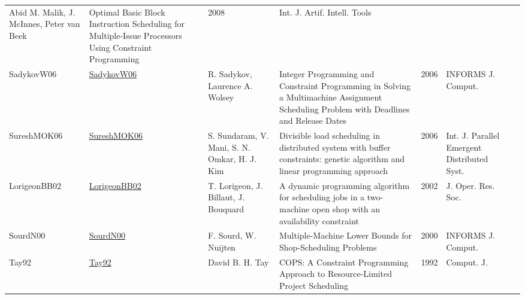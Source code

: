 {\begin{longtable}{llp{5cm}p{10cm}rp{3cm}l}
Abid M. Malik, J. McInnes, Peter van Beek & Optimal Basic Block Instruction Scheduling for Multiple-Issue Processors Using Constraint Programming & 2008 & Int. J. Artif. Intell. Tools & \cite{MalikMB08}\\SadykovW06 & \href{https://doi.org/10.1287/ijoc.1040.0110}{SadykovW06} & R. Sadykov, Laurence A. Wolsey & Integer Programming and Constraint Programming in Solving a Multimachine Assignment Scheduling Problem with Deadlines and Release Dates & 2006 & {INFORMS} J. Comput. & \cite{SadykovW06}\\SureshMOK06 & \href{https://doi.org/10.1080/17445760600567842}{SureshMOK06} & S. Sundaram, V. Mani, S. N. Omkar, H. J. Kim & Divisible load scheduling in distributed system with buffer constraints: genetic algorithm and linear programming approach & 2006 & Int. J. Parallel Emergent Distributed Syst. & \cite{SureshMOK06}\\LorigeonBB02 & \href{https://doi.org/10.1057/palgrave.jors.2601421}{LorigeonBB02} & T. Lorigeon, J. Billaut, J. Bouquard & A dynamic programming algorithm for scheduling jobs in a two-machine open shop with an availability constraint & 2002 & J. Oper. Res. Soc. & \cite{LorigeonBB02}\\SourdN00 & \href{https://doi.org/10.1287/ijoc.12.4.341.11881}{SourdN00} & F. Sourd, W. Nuijten & Multiple-Machine Lower Bounds for Shop-Scheduling Problems & 2000 & {INFORMS} J. Comput. & \cite{SourdN00}\\Tay92 & \href{}{Tay92} & David B. H. Tay & {COPS:} {A} Constraint Programming Approach to Resource-Limited Project Scheduling & 1992 & Comput. J. & \cite{Tay92}\\\end{longtable}
}

